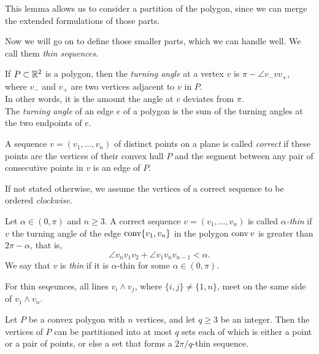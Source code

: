 This lemma allows us to consider a partition of the polygon, since we can merge the extended formulations of those parts.

Now we will go on to define those smaller parts, which we can handle well. We call them \emph{thin sequences}.

\begin{definition}
  If $P\subset\mathbb{R}^2$ is a polygon, then the \textit{turning angle} at a vertex $v$ is $\pi-\angle v_-vv_+$, where $v_-$ and $v_+$ are two vertices adjacent to $v$ in $P$. \\
  In other words, it is the amount the angle at $v$ deviates from $\pi$. \\
  The \textit{turning angle} of an edge $e$ of a polygon is the sum of the turning angles at the two endpoints of $e$.
\end{definition}

\begin{definition}
  A sequence $v=(v_1,\ldots,v_n)$ of distinct points on a plane is called \textit{correct} if these points are the vertices of their convex hull $P$ and the segment between any pair of consecutive points in $v$ is an edge of $P$.
\end{definition}

If not stated otherwise, we assume the vertices of a correct sequence to be ordered \emph{clockwise}.

\begin{definition}
  Let $\alpha\in(0,\pi)$ and $n \geq 3$. A correct sequence $v=(v_1,\ldots,v_n)$ is called $\alpha$\textit{-thin} if $v$ the turning angle of the edge $\operatorname{conv}\{v_1, v_n\}$ in the polygon $\operatorname{conv} v$ is greater than $2\pi-\alpha$, that is, $$\angle v_n v_1 v_2+\angle v_1v_nv_{n-1}<\alpha.$$ We say that $v$ is \textit{thin} if it is $\alpha$-thin for some $\alpha\in(0,\pi)$.
\end{definition}


For thin seqeunces, all lines $v_i \wedge v_j$, where $\{i,j\} \neq \{1,n\}$, meet on the same side of $v_1 \wedge v_n$.

\begin{observation}\label{observation:splitting}
  Let $P$ be a convex polygon with $n$ vertices, and let $q \geq 3$ be an integer. Then the vertices of $P$ can be partitioned into at most $q$ sets each of which is either a point or a pair of points, or else a set that forms a $2\pi/q$-thin sequence.
\end{observation}

